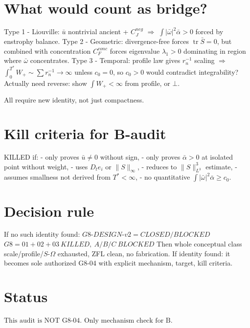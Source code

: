 \documentclass[11pt]{article}
\begin{document}
\section{What would count as bridge?}
Type 1 - Liouville: $\bar u$ nontrivial ancient + $C_J^{neg}$ $\Rightarrow$ $\int|\bar\omega|^2\bar\alpha>0$ forced by enstrophy balance.
Type 2 - Geometric: divergence-free forces $\operatorname{tr}\bar S=0$, but combined with concentration $C_F^{conc}$ forces eigenvalue $\lambda_1>0$ dominating in region where $\bar\omega$ concentrates.
Type 3 - Temporal: profile law gives $r_n^{-1}$ scaling $\Rightarrow$ $\int_0^{T^*}W_+\sim\sum r_n^{-1}\to\infty$ unless $c_0=0$, so $c_0>0$ would contradict integrability? Actually need reverse: show $\int W_+<\infty$ from profile, or $\bot$.

All require new identity, not just compactness.

\section{Kill criteria for B-audit}
KILLED if:
- only proves $\bar u\neq0$ without sign,
- only proves $\bar\alpha>0$ at isolated point without weight,
- uses $D_te_i$ or $\|S\|_\infty$,
- reduces to $\|S\|_{L^3}^3$ estimate,
- assumes smallness not derived from $T^*<\infty$,
- no quantitative $\int|\bar\omega|^2\bar\alpha\ge c_0$.

\section{Decision rule}
If no such identity found:
$\boxed{G8\text{-}DESIGN\text{-}v2=CLOSED/BLOCKED}$
$\boxed{G8=01+02+03\ KILLED,\ A/B/C\ BLOCKED}$
Then whole conceptual class scale/profile/$S$-$\Omega$ exhausted, ZFL clean, no fabrication.
If identity found: it becomes sole authorized G8-04 with explicit mechanism, target, kill criteria.

\section{Status}
$\boxed{\text{This audit is NOT G8-04. Only mechanism check for B.}}$
\end{document}
